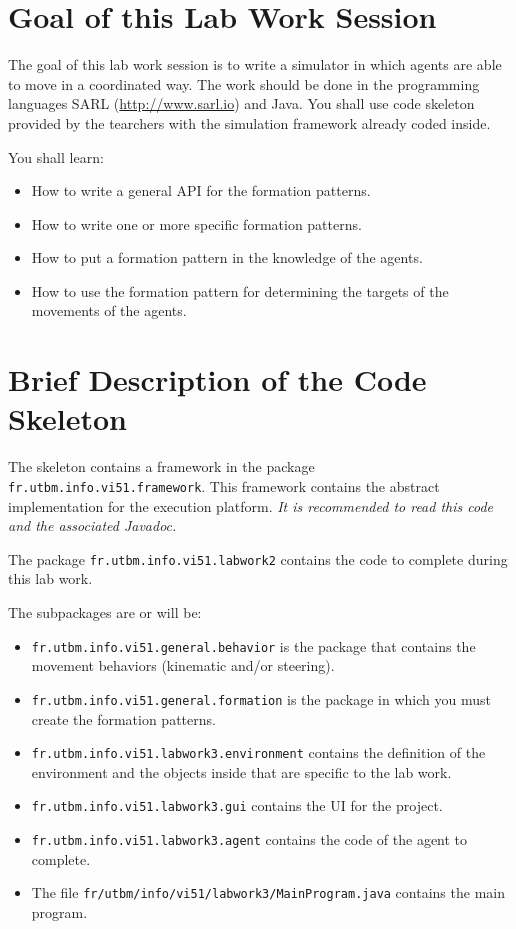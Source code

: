 \documentclass[article,english,nodocumentinfo]{multiagentfrreport}
\begin{document}
\section{Goal of this Lab Work Session}

The goal of this lab work session is to write a simulator in which agents are able to move in a coordinated way.
The work should be done in the programming languages SARL (\url{http://www.sarl.io}) and Java.
You shall use code skeleton provided by the tearchers with the simulation framework already coded inside.

You shall learn: 
\begin{itemize}
\item How to write a general API for the formation patterns.
\item How to write one or more specific formation patterns.
\item How to put a formation pattern in the knowledge of the agents.
\item How to use the formation pattern for determining the targets of the movements of the agents. 
\end{itemize}



\section{Brief Description of the Code Skeleton}

The skeleton contains a framework in the package \texttt{fr.utbm.info.vi51.framework}.
This framework contains the abstract implementation for the execution platform.
\emph{It is recommended to read this code and the associated Javadoc.}

The package \texttt{fr.utbm.info.vi51.labwork2} contains the code to complete during this lab work.

The subpackages are or will be:
\begin{itemize}
\item \texttt{fr.utbm.info.vi51.general.behavior} is the package that contains the movement behaviors (kinematic and/or steering).
\item \texttt{fr.utbm.info.vi51.general.formation} is the package in which you must create the formation patterns.
\item \texttt{fr.utbm.info.vi51.labwork3.environment} contains the definition of the environment and the objects inside that are specific to the lab work.
\item \texttt{fr.utbm.info.vi51.labwork3.gui} contains the UI for the project.
\item \texttt{fr.utbm.info.vi51.labwork3.agent} contains the code of the agent to complete.
\item The file \texttt{fr/utbm/info/vi51/labwork3/MainProgram.java} contains the main program.
\end{itemize}
\end{document}
